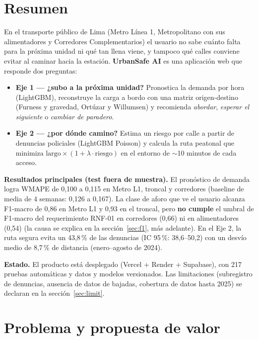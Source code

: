 \documentclass[11pt]{article}
\begin{document}
\section{Resumen}

En el transporte público de Lima (Metro Línea 1, Metropolitano con sus alimentadores y Corredores
Complementarios) el usuario no sabe cuánto falta para la próxima unidad ni qué tan llena viene, y
tampoco qué calles conviene evitar al caminar hacia la estación. \textbf{UrbanSafe AI} es una
aplicación web que responde dos preguntas:

\begin{itemize}
  \item \textbf{Eje 1 --- ¿subo a la próxima unidad?} Pronostica la demanda por hora (LightGBM),
        reconstruye la carga a bordo con una matriz origen-destino (Furness y gravedad, Ortúzar y
        Willumsen) y recomienda \emph{abordar}, \emph{esperar el siguiente} o \emph{cambiar de
        paradero}.
  \item \textbf{Eje 2 --- ¿por dónde camino?} Estima un riesgo por calle a partir de denuncias
        policiales (LightGBM Poisson) y calcula la ruta peatonal que minimiza
        $\text{largo}\times(1+\lambda\cdot\text{riesgo})$ en el entorno de $\sim$10 minutos de cada
        acceso.
\end{itemize}

\textbf{Resultados principales (test fuera de muestra).} El pronóstico de demanda logra WMAPE de
0,100 a 0,115 en Metro L1, troncal y corredores (baseline de media de 4 semanas: 0,126 a 0,167). La
clase de aforo que ve el usuario alcanza F1-macro de 0,86 en Metro L1 y 0,93 en el troncal, pero
\textbf{no cumple} el umbral de F1-macro del requerimiento RNF-01 en corredores (0,66) ni en
alimentadores (0,54) (la causa se explica en la sección~\ref{sec:f1}, más adelante). En el Eje 2, la ruta segura evita un 43,8\,\% de las denuncias
(IC 95\,\%: 38,6--50,2) con un desvío medio de 8,7\,\% de distancia (enero--agosto de 2024).

\textbf{Estado.} El producto está desplegado (Vercel + Render + Supabase), con 217 pruebas
automáticas y datos y modelos versionados. Las limitaciones (subregistro de denuncias, ausencia de
datos de bajadas, cobertura de datos hasta 2025) se declaran en la sección~\ref{sec:limit}.

\section{Problema y propuesta de valor}
\end{document}
